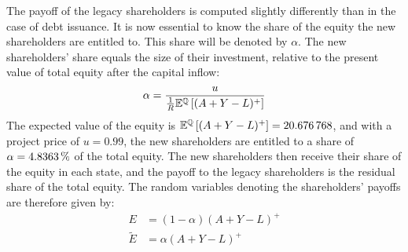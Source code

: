 \documentclass[main.tex]{subfiles}
\begin{document}
        The payoff of the legacy shareholders is computed slightly differently than in the case of debt issuance. 
        It is now essential to know the share of the equity the new shareholders are entitled to.
        This share will be denoted by $\alpha$.
        The new shareholders' share equals the size of their investment,
        relative to the present value of total equity after the capital inflow:
        \begin{equation*}
            \alpha = 
                \frac{
                    u
                }{
                    \frac{1}{R}
                    \mathbb{E}^{\mathbb{Q}}\left[
                        (A + Y - L)^{+}
                    \right]
                }
        \end{equation*}
        The expected value of the equity is 
        $\mathbb{E}^{\mathbb{Q}}\left[(A + Y - L)^{+}\right] = \num{20.676768}$,
        and with a project price of $u = 0.99$, the new shareholders are entitled to a share of
        $\alpha = \pct{0.048363}$ of the total equity.
        The new shareholders then receive their share of the equity in each state, 
        and the payoff to the legacy shareholders is the residual share of the total equity.
        The random variables denoting the shareholders' payoffs are therefore given by:
            \begin{align*}
                E 
                &= 
                (1 - \alpha)
                (A + Y - L)^{+} 
                \\
                \tilde{E}
                &=
                \alpha
                (A + Y - L)^{+}
            \end{align*}
        
\end{document}

